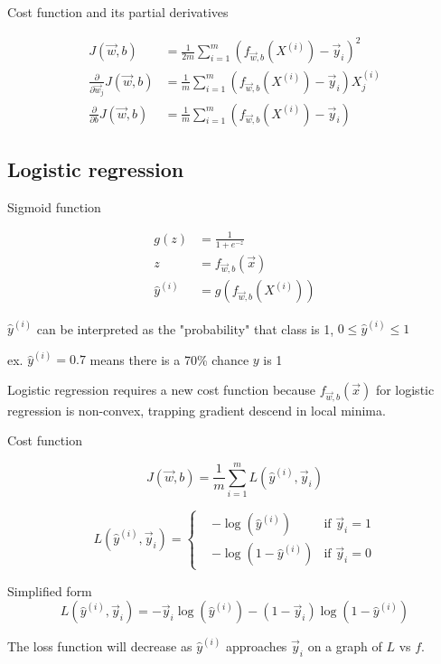 \documentclass[12pt]{article}
\begin{document}
Cost function and its partial derivatives

\begin{align*}
    J(\vec{w},b) &= \frac{1}{2m} \sum_{i=1}^{m} (f_{\vec{w},b}(X^{(i)}) - \vec{y}_i)^2\\
    \frac{\partial}{\partial \vec{w}_j} J(\vec{w},b) &= \frac{1}{m} \sum_{i=1}^{m} (f_{\vec{w},b}(X^{(i)}) - \vec{y}_i) X_j^{(i)}\\
    \frac{\partial}{\partial b} J(\vec{w},b) &= \frac{1}{m} \sum_{i=1}^{m} (f_{\vec{w},b}(X^{(i)}) - \vec{y}_i)
\end{align*}

\subsection{Logistic regression}

Sigmoid function

\begin{align*}
    g(z) &= \frac{1}{1 + e^{-z}}\\
    z &= f_{\vec{w},b}(\vec{x})\\
    \hat{y}^{(i)} &= g(f_{\vec{w},b}(X^{(i)}))
\end{align*}

$\hat{y}^{(i)}$ can be interpreted as the "probability" that class is 1, $0 \leq \hat{y}^{(i)} \leq 1$

ex. $\hat{y}^{(i)} = 0.7$ means there is a 70\% chance $y$ is 1

Logistic regression requires a new cost function because $f_{\vec{w},b}(\vec{x})$ for logistic regression is non-convex, trapping gradient descend in local minima.

Cost function

\[ J(\vec{w},b) = \frac{1}{m} \sum_{i=1}^{m} L(\hat{y}^{(i)},\vec{y}_i) \]

\begin{equation*}
L(\hat{y}^{(i)},\vec{y}_i) = 
  \left\{
    \begin{aligned}
      & -\log(\hat{y}^{(i)}) & \text{if } \vec{y}_i = 1 \\
      & -\log(1 - \hat{y}^{(i)}) & \text{if } \vec{y}_i = 0
    \end{aligned}
  \right.
\end{equation*}

Simplified form
\[ L(\hat{y}^{(i)}, \vec{y}_i) = -\vec{y}_i \log(\hat{y}^{(i)}) - (1 - \vec{y}_i) \log (1 - \hat{y}^{(i)}) \]

The loss function will decrease as $\hat{y}^{(i)}$ approaches $\vec{y}_i$ on a graph of $L$ vs $f$.
\end{document}
